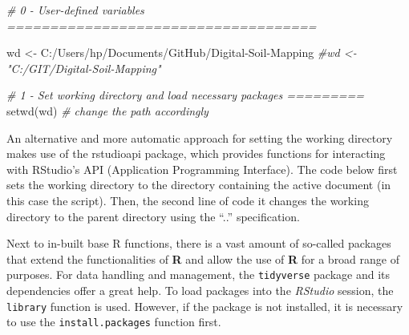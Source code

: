 \documentclass[
  10pt,
  b5paper,
  oneside]{book}
\newenvironment{Shaded}{\begin{snugshade}}{\end{snugshade}}
\newcommand{\CommentTok}[1]{\textcolor[rgb]{0.56,0.35,0.01}{\textit{#1}}}
\newcommand{\FunctionTok}[1]{\textcolor[rgb]{0.00,0.00,0.00}{#1}}
\newcommand{\NormalTok}[1]{#1}
\newcommand{\OtherTok}[1]{\textcolor[rgb]{0.56,0.35,0.01}{#1}}
\newcommand{\SpecialCharTok}[1]{\textcolor[rgb]{0.00,0.00,0.00}{#1}}
\newcommand{\StringTok}[1]{\textcolor[rgb]{0.31,0.60,0.02}{#1}}
\begin{document}
\begin{Shaded}
\begin{Highlighting}[]
\CommentTok{\# 0 {-} User{-}defined variables ====================================}

\NormalTok{wd }\OtherTok{\textless{}{-}} \StringTok{\textquotesingle{}C:/Users/hp/Documents/GitHub/Digital{-}Soil{-}Mapping\textquotesingle{}}
\CommentTok{\#wd \textless{}{-} "C:/GIT/Digital{-}Soil{-}Mapping"}

\CommentTok{\# 1 {-} Set working directory and load necessary packages =========}
\FunctionTok{setwd}\NormalTok{(wd) }\CommentTok{\# change the path accordingly}
\end{Highlighting}
\end{Shaded}

An alternative and more automatic approach for setting the working directory makes use of the rstudioapi package, which provides functions for interacting with RStudio's API (Application Programming Interface). The code below first sets the working directory to the directory containing the active document (in this case the script). Then, the second line of code it changes the working directory to the parent directory using the ``..'' specification.

\begin{Shaded}
\end{Shaded}

Next to in-built base R functions, there is a vast amount of so-called packages that extend the functionalities of \textbf{R} and allow the use of \textbf{R} for a broad range of purposes. For data handling and management, the \texttt{tidyverse} package and its dependencies offer a great help. To load packages into the \emph{RStudio} session, the \texttt{library} function is used. However, if the package is not installed, it is necessary to use the \texttt{install.packages} function first.
\end{document}
